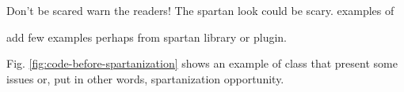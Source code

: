 Don't be scared warn the readers!
The spartan look could be scary.
examples of  

add few examples perhaps from spartan library or plugin. 

Fig. \ref{fig:code-before-spartanization} shows an example of class 
that present some issues or, put in other words, spartanization opportunity. 

% 
